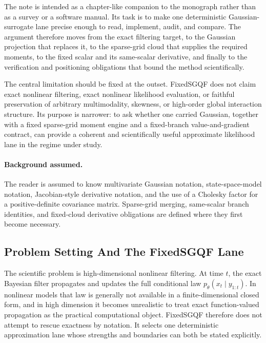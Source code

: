 \documentclass[11pt]{article}
\numberwithin{equation}{section}
\begin{document}
The note is intended as a chapter-like companion to the monograph rather than as
a survey or a software manual.  Its task is to make one deterministic
Gaussian-surrogate lane precise enough to read, implement, audit, and compare.
The argument therefore moves from the exact filtering target, to the Gaussian
projection that replaces it, to the sparse-grid cloud that supplies the required
moments, to the fixed scalar and its same-scalar derivative, and finally to the
verification and positioning obligations that bound the method scientifically.

The central limitation should be fixed at the outset.  FixedSGQF does not claim
exact nonlinear filtering, exact nonlinear likelihood evaluation, or faithful
preservation of arbitrary multimodality, skewness, or high-order global
interaction structure.  Its purpose is narrower: to ask whether one carried
Gaussian, together with a fixed sparse-grid moment engine and a fixed-branch
value-and-gradient contract, can provide a coherent and scientifically useful
approximate likelihood lane in the regime under study.

\paragraph{Background assumed.}
The reader is assumed to know multivariate Gaussian notation, state-space-model
notation, Jacobian-style derivative notation, and the use of a Cholesky factor
for a positive-definite covariance matrix.  Sparse-grid merging, same-scalar
branch identities, and fixed-cloud derivative obligations are defined where they
first become necessary.

\tableofcontents

\subsection{Problem Setting And The FixedSGQF Lane}
\label{sec:p32-problem-lane}

The scientific problem is high-dimensional nonlinear filtering.  At time
\(t\), the exact Bayesian filter propagates and updates the full conditional law
\(p_\theta(x_t\mid y_{1:t})\).  In nonlinear models that law is generally not
available in a finite-dimensional closed form, and in high dimension it becomes
unrealistic to treat exact function-valued propagation as the practical
computational object.  FixedSGQF therefore does not attempt to rescue exactness
by notation.  It selects one deterministic approximation lane whose strengths and
boundaries can both be stated explicitly.
\end{document}
